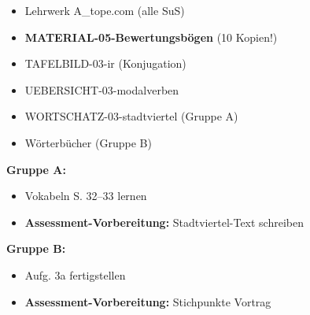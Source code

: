 \documentclass[11pt, a4paper]{article}
\begin{document}
\begin{minipage}[t]{0.48\textwidth}
\begin{tcolorbox}[
    colback=hellgrau,
    colframe=phase,
    title={\footnotesize\bfseries Material-Checkliste},
    fonttitle=\bfseries,
    boxrule=0.5pt,
    top=2pt, bottom=2pt, left=4pt, right=4pt
]
\footnotesize
\begin{itemize}
\item[$\square$] Lehrwerk A\_tope.com (alle SuS)
\item[$\square$] \textbf{MATERIAL-05-Bewertungsbögen} (10 Kopien!)
\item[$\square$] TAFELBILD-03-ir (Konjugation)
\item[$\square$] UEBERSICHT-03-modalverben
\item[$\square$] WORTSCHATZ-03-stadtviertel (Gruppe A)
\item[$\square$] Wörterbücher (Gruppe B)
\end{itemize}
\end{tcolorbox}
\end{minipage}
\hfill
\begin{minipage}[t]{0.48\textwidth}
\begin{tcolorbox}[
    colback=spanisch!10,
    colframe=spanisch,
    title={\footnotesize\bfseries Hausaufgabe},
    fonttitle=\bfseries,
    boxrule=0.5pt,
    top=2pt, bottom=2pt, left=4pt, right=4pt
]
\footnotesize
\textbf{Gruppe A:}
\begin{itemize}
\item Vokabeln S. 32--33 lernen
\item \textbf{Assessment-Vorbereitung:} Stadtviertel-Text schreiben
\end{itemize}
\textbf{Gruppe B:}
\begin{itemize}
\item Aufg. 3a fertigstellen
\item \textbf{Assessment-Vorbereitung:} Stichpunkte Vortrag
\end{itemize}
\end{tcolorbox}
\end{minipage}

\vspace{0.2cm}

\end{document}
